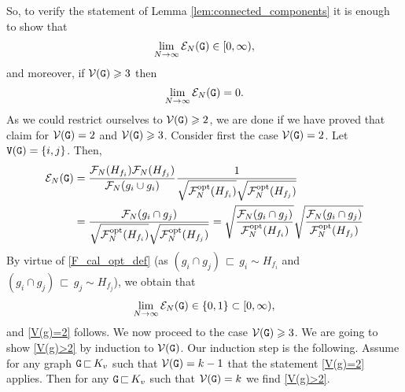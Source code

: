 \documentclass[11pt,reqno]{amsart}
\numberwithin{equation}{section}
\newcommand{\nelem}[1]{{Lemma \ref{#1}}}
\begin{document}
So, to verify the statement of \nelem{lem:connected_components} it is enough to show that
\begin{align}
    \lim_{N\to\infty}\mathcal{E}_N({\tt G})\in[0,\infty),\label{V(g)=2}
\end{align}
and moreover, if $\mathcal{V}({\tt G})\geqslant 3$ then
\begin{align}
    \lim_{N\to\infty}\mathcal{E}_N({\tt G})=0.\label{V(g)>2}
\end{align}
As we could restrict ourselves to  $\mathcal{V}({\tt G})\geqslant 2$, we are done if we have proved that claim for $\mathcal{V}({\tt G})= 2$ and $\mathcal{V}({\tt G})\geqslant 3$. Consider first the case $\mathcal{V}({\tt G})= 2$. Let ${\tt V}({\tt G}) = \{i,j\}$. Then,
\begin{align*}
    \mathcal{E}_N({\tt G}) &= \frac{\mathcal{F}_N({H}_{f_{i}})\mathcal{F}_N({H}_{f_{j}})}{\mathcal{F}_N(g_{i}\cup g_i)}\frac{1}{\sqrt{\mathcal{F}^{\rm{opt}}_N({H}_{f_i})}\sqrt{\mathcal{F}^{\rm{opt}}_N({H}_{f_j})}}\\
    &=\frac{\mathcal{F}_N(g_i\cap g_j)}{\sqrt{\mathcal{F}^{\rm{opt}}_N({H}_{f_i})}\sqrt{\mathcal{F}^{\rm{opt}}_N({H}_{f_j})}}=\sqrt{\frac{\mathcal{F}_N(g_i\cap g_j)}{\mathcal{F}^{\rm{opt}}_N({H}_{f_i})}}\sqrt{\frac{\mathcal{F}_N(g_i\cap g_j)}{\mathcal{F}^{\rm{opt}}_N({H}_{f_j})}}
\end{align*}
By virtue of \eqref{F_cal_opt_def} (as $(g_i\cap g_j) {\,\sqsubset\,} g_i\sim {H}_{f_i}$ and $(g_i\cap g_j) {\,\sqsubset\,} g_j\sim {H}_{f_j}$), we obtain that
\begin{align*}
    \lim_{N\to\infty}\mathcal{E}_N({\tt G}) \in\{0,{1}\}\subset[0,\infty),
\end{align*}
and \eqref{V(g)=2} follows. We now proceed to the case $\mathcal{V}({\tt G})\geqslant 3$. We are going to show \eqref{V(g)>2} by induction to $\mathcal{V}({\tt G})$. Our induction step is the following. Assume for any graph ${\tt G}{\,\sqsubset\,} K_v$ such that $\mathcal{V}({\tt G})=k-1$ that the statement \eqref{V(g)=2} {applies}. Then for any ${\tt G}{\,\sqsubset\,} K_v$ such that 
$\mathcal{V}({\tt G})=k$ we find \eqref{V(g)>2}. 
\end{document}
